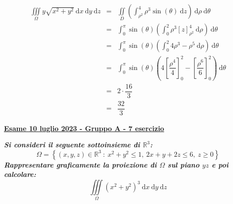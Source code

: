 \documentclass[a4paper]{article}
\newcommand{\definition}[1]{\textcolor{Red3}{\textbf{#1}}}
\newcommand{\example}[1]{\textcolor{Green4}{\textbf{#1}}}
\begin{document}
	\begin{equation*}
		\begin{array}{rcl}
			\displaystyle\iiint\limits_{\Omega} y\sqrt{x^{2}+y^{2}} \:\mathrm{d}x\:\mathrm{d}y\:\mathrm{d}z
			&=&
			\displaystyle\iint\limits_{D} \left(\int_{\rho^{2}}^{4} \rho^{3} \sin\left(\theta\right) \:\mathrm{d}z\right) \:\mathrm{d}\rho\:\mathrm{d}\theta \\ [1.5em]
			&=&
			\displaystyle\int_{0}^{\pi} \sin\left(\theta\right) \left(\int_{0}^{2} \rho^{3} \left[z\right]_{\rho^{2}}^{4} \:\mathrm{d}\rho\right)\:\mathrm{d}\theta \\ [1.5em]
			&=&
			\displaystyle\int_{0}^{\pi} \sin\left(\theta\right) \left(\int_{0}^{2} 4\rho^{3} - \rho^{5} \:\mathrm{d}\rho\right)\:\mathrm{d}\theta \\ [1.5em]
			&=&
			\displaystyle\int_{0}^{\pi} \sin\left(\theta\right) \left(4\left[\dfrac{\rho^{4}}{4}\right]_{0}^{2} - \left[\dfrac{\rho^{6}}{6}\right]_{0}^{2}\right)\:\mathrm{d}\theta \\ [1.5em]
			&=&
			2 \cdot \dfrac{16}{3} \\ [.5em]
			&=&
			\dfrac{32}{3}
		\end{array}
	\end{equation*}
	
	\newpage

	\begin{flushleft}
		\label{exam: esame 10 luglio 2023 - Gruppo A - 7 esercizio}
		\hypertarget{
			exam: esame 10 luglio 2023 - Gruppo A - 7 esercizio
		}{
			\definition{\underline{Esame 10 luglio 2023 - Gruppo A - 7 esercizio}}
		}
	\end{flushleft}
	\example{\emph{Si consideri il seguente sottoinsieme di $\mathbb{R}^{3}$:}
	\begin{equation*}
		\Omega = \left\{\left(x,y,z\right) \in \mathbb{R}^{3} \: : \: x^{2}+y^{2} \le 1, \: 2x + y + 2z \le 6, \: z \ge 0\right\}
	\end{equation*}
	\emph{Rappresentare graficamente la proiezione di $\Omega$ sul piano $yz$ e poi calcolare:}
	\begin{equation*}
		\displaystyle\iiint\limits_{\Omega} \left(x^{2}+y^{2}\right)^{3} \:\mathrm{d}x\:\mathrm{d}y\:\mathrm{d}z
	\end{equation*}}
\end{document}
